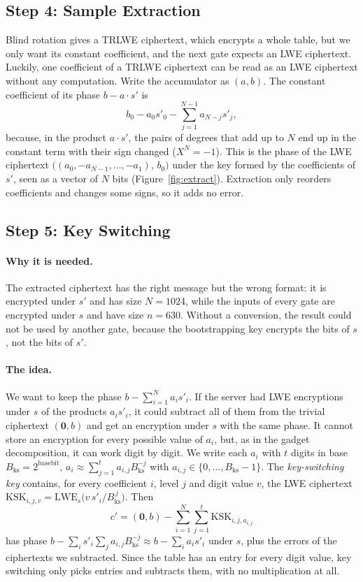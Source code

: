 \documentclass[12pt]{article}
\theoremstyle{plain}
\theoremstyle{definition}
\newcommand{\Bks}{B_{\mathrm{ks}}}
\newcommand{\KSK}{\mathrm{KSK}}
\begin{document}


\subsection{Step 4: Sample Extraction}
\label{sec:extract}

Blind rotation gives a TRLWE ciphertext, which encrypts a whole table, but we
only want its constant coefficient, and the next gate expects an LWE
ciphertext. Luckily, one coefficient of a TRLWE ciphertext can be read as an
LWE ciphertext without any computation. Write the accumulator as $(a,b)$. The
constant coefficient of its phase $b-a\cdot s'$ is
\[
  b_0-a_0s'_0-\sum_{j=1}^{N-1}a_{N-j}s'_j,
\]
because, in the product $a\cdot s'$, the pairs of degrees that add up to $N$
end up in the constant term with their sign changed ($X^N=-1$). This is the
phase of the LWE ciphertext $\big((a_0,-a_{N-1},\dots,-a_1),\,b_0\big)$ under the
key formed by the coefficients of $s'$, seen as a vector of $N$ bits
(Figure~\ref{fig:extract}). Extraction only reorders coefficients and changes
some signs, so it adds no error.



\subsection{Step 5: Key Switching}
\label{sec:ks}

\paragraph{Why it is needed.}
The extracted ciphertext has the right message but the wrong format: it is
encrypted under $s'$ and has size $N=1024$, while the inputs of every gate are
encrypted under $s$ and have size $n=630$. Without a conversion, the result
could not be used by another gate, because the bootstrapping key encrypts the
bits of $s$, not the bits of $s'$.

\paragraph{The idea.}
We want to keep the phase $b-\sum_{i=1}^{N}a_is'_i$. If the server had LWE
encryptions under $s$ of the products $a_is'_i$, it could subtract all of them
from the trivial ciphertext $(\mathbf0,b)$ and get an encryption under $s$ with
the same phase. It cannot store an encryption for every possible value of
$a_i$, but, as in the gadget decomposition, it can work digit by digit. We
write each $a_i$ with $t$ digits in base $\Bks=2^{\mathrm{basebit}}$,
$a_i\approx\sum_{j=1}^{t}a_{i,j}\Bks^{-j}$ with $a_{i,j}\in\{0,\dots,\Bks-1\}$. The
\emph{key-switching key} contains, for every coefficient $i$, level $j$ and digit
value $v$, the LWE ciphertext
$\KSK_{i,j,v}=\mathrm{LWE}_s\big(v\,s'_i/\Bks^{\,j}\big)$. Then
\[
  c'=(\mathbf{0},b)-\sum_{i=1}^{N}\sum_{j=1}^{t}\KSK_{i,j,a_{i,j}}
\]
has phase $b-\sum_is'_i\sum_ja_{i,j}\Bks^{-j}\approx b-\sum_ia_is'_i$ under $s$,
plus the errors of the ciphertexts we subtracted. Since the table has an entry
for every digit value, key switching only picks entries and subtracts them,
with no multiplication at all.
\end{document}
